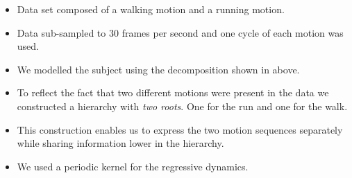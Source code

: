 \documentclass[english,color,smalltitle]{manchesterposter}
\begin{document}
\begin{multicols}{5}{\LARGE \par}
\begin{columnbox}
\end{columnbox}


\begin{columnbox}
\-


\begin{itemize}
\item Data set composed of a walking motion and a running motion.{\large \par}
\item Data sub-sampled to 30 frames per second and one cycle of each motion
was used. {\large \par}
\item We modelled the subject using the decomposition shown in above.{\large \par}
\item To reflect the fact that two different motions were present in the
data we constructed a hierarchy with \emph{two roots}. One for the
run and one for the walk.{\large \par}
\item This construction enables us to express the two motion sequences separately
while sharing information lower in the hierarchy.{\large \par}
\item We used a periodic kernel for the regressive dynamics. {\large \par}
\end{itemize}
\end{columnbox}


\begin{columnbox}
\-



\end{columnbox}
\end{multicols}
\end{document}

